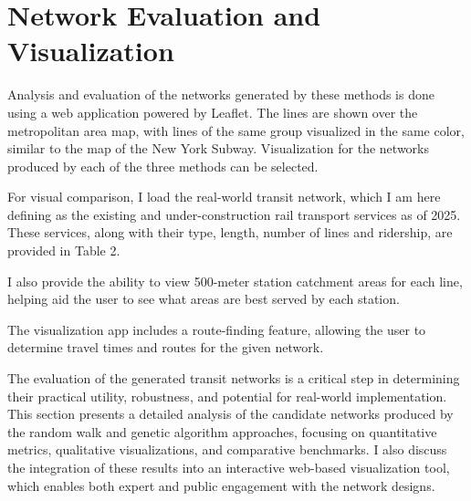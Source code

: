\documentclass[manuscript,nonacm]{acmart}
\begin{document}
\section{Network Evaluation and Visualization}

Analysis and evaluation of the networks generated by these methods is done using a web application powered by Leaflet. The lines are shown over the metropolitan area map, with lines of the same group visualized in the same color, similar to the map of the New York Subway. Visualization for the networks produced by each of the three methods can be selected.

For visual comparison, I load the real-world transit network, which I am here defining as the existing and under-construction rail transport services as of 2025. These services, along with their type, length, number of lines and ridership, are provided in Table 2. 

I also provide the ability to view 500-meter station catchment areas for each line, helping aid the user to see what areas are best served by each station.

The visualization app includes a route-finding feature, allowing the user to determine travel times and routes for the given network.

The evaluation of the generated transit networks is a critical step in determining their practical utility, robustness, and potential for real-world implementation. This section presents a detailed analysis of the candidate networks produced by the random walk and genetic algorithm approaches, focusing on quantitative metrics, qualitative visualizations, and comparative benchmarks. I also discuss the integration of these results into an interactive web-based visualization tool, which enables both expert and public engagement with the network designs.
\end{document}
